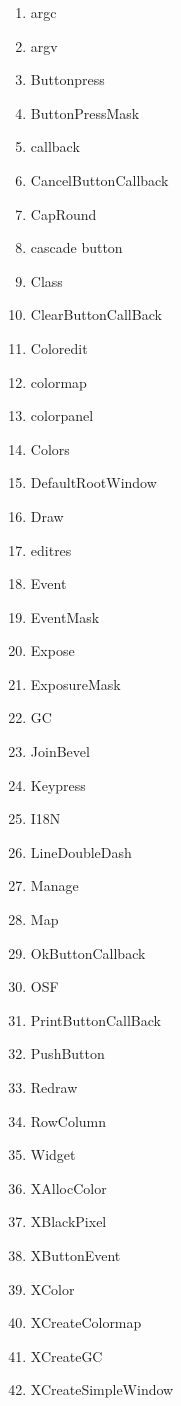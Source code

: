 \documentclass[twoside]{article}
\begin{document}
\begin{enumerate}
\begin{multicols}{2}

\begin{enumerate}
\setlength{\itemsep}{0in}
\renewcommand{\theenumii}{\arabic{enumii}}
\item argc
\item argv
\item Buttonpress
\item ButtonPressMask
\item callback
\item CancelButtonCallback
\item CapRound
\item cascade button
\item Class
\item ClearButtonCallBack
\item Coloredit
\item colormap
\item colorpanel
\item Colors
\item DefaultRootWindow
\item Draw
\item editres
\item Event
\item EventMask
\item Expose
\item ExposureMask
\item GC
\item JoinBevel
\item Keypress
\item I18N
\item LineDoubleDash
\item Manage
\item Map
\item OkButtonCallback
\item OSF
\item PrintButtonCallBack
\item PushButton
\item Redraw
\item RowColumn
\item Widget
\item XAllocColor
\item XBlackPixel
\item XButtonEvent
\item XColor
\item XCreateColormap
\item XCreateGC
\item XCreateSimpleWindow

\end{enumerate}
\end{multicols}
\end{enumerate}
\end{document}
